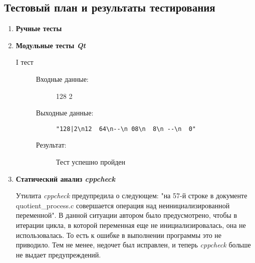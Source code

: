 \documentclass[12pt,a4paper]{report}
\begin{document}
\subsection{Тестовый план и результаты тестирования}
\hspace{\parindent}
\begin{enumerate}

\item \textbf{Ручные тесты}


\item \textbf{Модульные тесты \textit{Qt}}

\begin{description}
\item[I тест]
\hspace{\parindent}
\begin{flushleft}
\begin{description}
\item[Входные данные:] 128 2
\item[Выходные данные:] \verb/"128|2\n12  64\n--\n 08\n  8\n --\n  0"/
\item[Результат:] Тест успешно пройден
\end{description}
\end{flushleft}
\end{description}

\item \textbf{Статический анализ \textit{cppcheck}}

Утилита \textit{cppcheck} предупредила о следующем: "на 57-й строке в документе quotient\_process.c совершается операция над неинициализированной переменной".
В данной ситуации автором было предусмотрено, чтобы в итерации цикла, в которой переменная еще не инициализировалась, она не использовалась. То есть к ошибке в выполнении программы это не приводило. Тем не менее, недочет был исправлен, и теперь \textit{cppcheck} больше не выдает предупреждений.
\end{enumerate}
\end{document}
